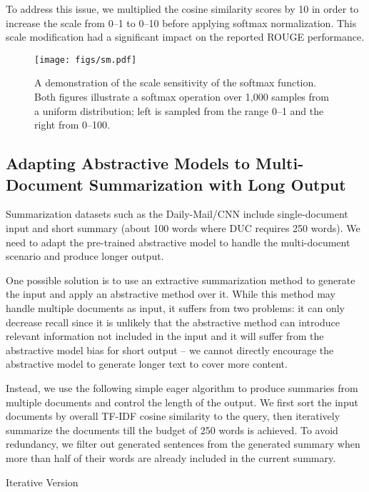 \documentclass[11pt,a4paper]{article}
\begin{document}
To address this issue, we multiplied the cosine similarity scores by 10 in order to increase the scale from 0--1 to 0--10 before applying softmax normalization. This scale modification had a significant impact on the reported ROUGE performance.

\begin{figure}
  \centering 
  \texttt{[image: figs/sm.pdf]} 
  \caption{A demonstration of the scale sensitivity of the softmax function. Both figures illustrate a softmax operation over 1,000 samples from a uniform distribution; left is sampled from the range 0--1 and the right from 0--100.}\label{fig:RSAsm} 
\end{figure} 

\subsection{Adapting Abstractive Models to Multi-Document Summarization with Long Output}

Summarization datasets such as the Daily-Mail/CNN include single-document input and short summary (about 100 words where DUC requires 250 words).  We need to adapt the pre-trained abstractive model to handle the multi-document scenario and produce longer output.

One possible solution is to use an extractive summarization method to generate the input and apply an abstractive method over it. While this method may handle multiple documents as input, it suffers from two problems: 
it can only decrease recall since it is unlikely that the abstractive method can introduce relevant information not included in the input and it will suffer from the abstractive model bias for short output -- we cannot directly encourage the abstractive model to generate longer text to cover more content.

Instead, we use the following simple eager algorithm to produce summaries from multiple documents and control the length of the output. We first sort the input documents by overall TF-IDF cosine similarity to the query, then iteratively summarize the documents till the budget of 250 words is achieved. 
To avoid redundancy, we filter out generated sentences from the generated summary when more than half of their words are already included in the current summary. 

\begin{algorithm} 
\begin{small}
  \begin{algorithmic}
  \State 
  \State 
  \For{}
  	\State 
  	\For{}
    	\If{}
        	\State 
        \EndIf
        \If{}
        	\State 
        \EndIf
  	\EndFor
  \EndFor
  \end{algorithmic}
 \end{small}
  \caption{Iterative Version}
      \label{RSAalgo}
\end{algorithm}
\end{document}
